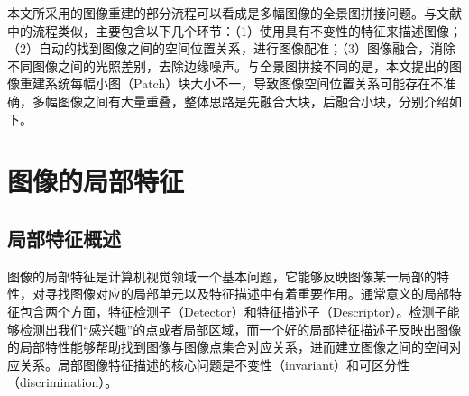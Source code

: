 

本文所采用的图像重建的部分流程可以看成是多幅图像的全景图拼接问题。与文献\cite{Brown:2006ir}中的流程类似，主要包含以下几个环节：（1）使用具有不变性的特征来描述图像；（2）自动的找到图像之间的空间位置关系，进行图像配准；（3）图像融合，消除不同图像之间的光照差别，去除边缘噪声。与全景图拼接不同的是，本文提出的图像重建系统每幅小图（Patch）块大小不一，导致图像空间位置关系可能存在不准确，多幅图像之间有大量重叠，整体思路是先融合大块，后融合小块，分别介绍如下。

\section{图像的局部特征}

\subsection{局部特征概述}
图像的局部特征是计算机视觉领域一个基本问题，它能够反映图像某一局部的特性，对寻找图像对应的局部单元以及特征描述中有着重要作用。通常意义的局部特征包含两个方面，特征检测子（Detector）和特征描述子（Descriptor）。检测子能够检测出我们“感兴趣”的点或者局部区域，而一个好的局部特征描述子反映出图像的局部特性能够帮助找到图像与图像点集合对应关系，进而建立图像之间的空间对应关系。局部图像特征描述的核心问题是不变性（invariant）和可区分性（discrimination）。


